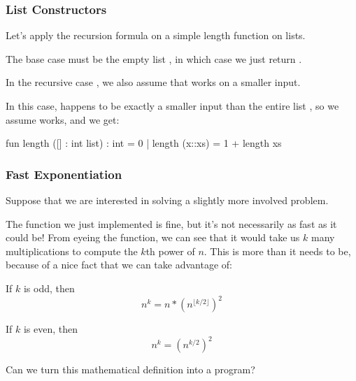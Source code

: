 \documentclass[aspectratio=169]{beamer}
\begin{document}
\begin{frame}[fragile]
  \frametitle{List Constructors}

  Let's apply the recursion formula on a simple length function on lists.

  \pause
  \vspace{\fill}

  The base case must be the empty list \code{[]}, in which case we just return .

  \pause
  \vspace{10pt}

  In the recursive case , we also assume that  works on a smaller
  input.

  \pause
  \vspace{5pt}

  In this case,  happens to be exactly a smaller input than the entire
  list , so we assume  works, and we get:

  \pause
  \vspace{\fill}

  \begin{codeblock}
    fun length ([] : int list) : int = 0
      | length (x::xs) = 1 + length xs
  \end{codeblock}
\end{frame}


\begin{frame}[fragile]
  \frametitle{Fast Exponentiation}

  Suppose that we are interested in solving a slightly more involved problem.

  \pause
  \vspace{\fill}

  The  function we just implemented is fine, but it's not necessarily
  as fast as it could be! From eyeing the function, we can see that it would take
  us $k$ many multiplications to compute the $k$th power of $n$. This is more
  than it needs to be, because of a nice fact that we can take advantage of:

  \pause
  \vspace{\fill}

  If $k$ is odd, then $$n^k = n * \left (n^{\lfloor k/2 \rfloor} \right )^2$$

  \pause

  If $k$ is even, then $$n^k = \left (n^{k/2} \right )^2$$

  \pause
  \vspace{\fill}

  Can we turn this mathematical definition into a program?
\end{frame}
\end{document}
